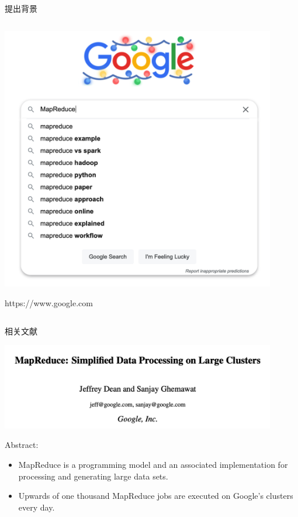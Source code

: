 \begin{frame}{\begin{CJK}{UTF8}{gkai}提出背景
			\end{CJK}}
\begin{columns}
		\begin{column}{0.5\textwidth}
			\centerline{\includegraphics[width = 0.9\textwidth]{Figures/google.png}}
			\centerline{https://www.google.com}
		\end{column}
	\end{columns}
\end{frame}

\begin{frame}{\begin{CJK}{UTF8}{gkai}相关文献
	\end{CJK}}
	\centerline{\includegraphics[width = 0.9\textwidth]{Figures/ref.png}}
	Abstract:
	\begin{itemize}
		\item MapReduce is a programming model and an associated implementation for \alert{processing and generating large data sets}.
		\item Upwards of one thousand MapReduce jobs are executed on Google’s clusters every day.
	\end{itemize}
\end{frame}

